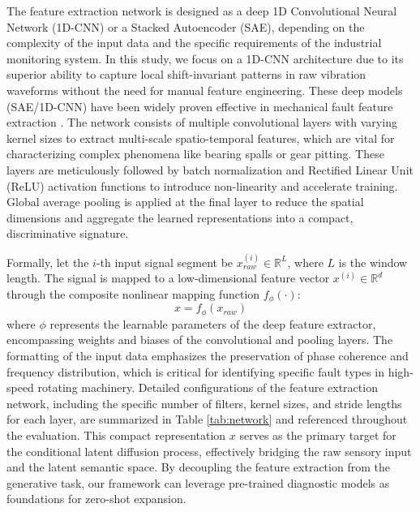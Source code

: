 The feature extraction network is designed as a deep 1D Convolutional Neural Network (1D-CNN) or a Stacked Autoencoder (SAE), depending on the complexity of the input data and the specific requirements of the industrial monitoring system. In this study, we focus on a 1D-CNN architecture due to its superior ability to capture local shift-invariant patterns in raw vibration waveforms without the need for manual feature engineering. These deep models (SAE/1D-CNN) have been widely proven effective in mechanical fault feature extraction \cite{Vincent2010SAE, LeCun2015CNN}. The network consists of multiple convolutional layers with varying kernel sizes to extract multi-scale spatio-temporal features, which are vital for characterizing complex phenomena like bearing spalls or gear pitting. These layers are meticulously followed by batch normalization and Rectified Linear Unit (ReLU) activation functions to introduce non-linearity and accelerate training. Global average pooling is applied at the final layer to reduce the spatial dimensions and aggregate the learned representations into a compact, discriminative signature.

Formally, let the $i$-th input signal segment be $x_{raw}^{(i)} \in \mathbb{R}^L$, where $L$ is the window length. The signal is mapped to a low-dimensional feature vector $x^{(i)} \in \mathbb{R}^d$ through the composite nonlinear mapping function $f_{\phi}(\cdot)$:
\begin{equation}
x = f_{\phi}(x_{raw})
\end{equation}
where $\phi$ represents the learnable parameters of the deep feature extractor, encompassing weights and biases of the convolutional and pooling layers. The formatting of the input data emphasizes the preservation of phase coherence and frequency distribution, which is critical for identifying specific fault types in high-speed rotating machinery. Detailed configurations of the feature extraction network, including the specific number of filters, kernel sizes, and stride lengths for each layer, are summarized in Table \ref{tab:network} and referenced throughout the evaluation. This compact representation $x$ serves as the primary target for the conditional latent diffusion process, effectively bridging the raw sensory input and the latent semantic space. By decoupling the feature extraction from the generative task, our framework can leverage pre-trained diagnostic models as foundations for zero-shot expansion.

